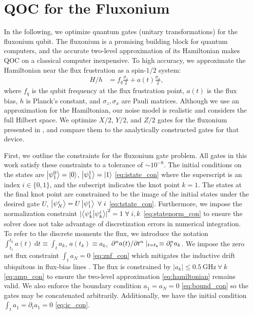 \section{QOC for the Fluxonium \label{sec:fluxonium}}
In the following, we optimize quantum gates
(unitary transformations) for the fluxonium qubit.
The fluxonium is a promising building block
for quantum computers, and the accurate
two-level approximation of its Hamiltonian makes
QOC on a classical computer inexpensive.
To high accuracy, we approximate the Hamiltonian near the flux frustration
as a spin-$1/2$ system:
\begin{align}
  H/h &= f_{q} \frac{\sigma_{z}}{2} + a(t) \frac{\sigma_{x}}{2},
  \label{eq:hamiltonian}
\end{align}
where $f_{q}$ is the qubit frequency at the flux frustration point,
$a(t)$ is the flux bias, $h$ is Planck's constant, and $\sigma_{z}, \sigma_{x}$
are Pauli matrices. Although we use an approximation for the Hamiltonian,
our noise model is realistic and considers the full Hilbert space. We optimize $X/2$,
$Y/2$, and $Z/2$ gates for the fluxonium presented in \cite{zhang2020universal},
and compare them to the analytically constructed gates for
that device.

First, we outline the constraints for the fluxonium gate problem.
All gates in this work satisfy these constraints to a tolerance
of $\sim 10^{-8}$.
The initial conditions on
the states are $\ket{\psi^{0}_{1}} = \ket{0}$, $\ket{\psi^{1}_{1}} = \ket{1}$
\eqref{eq:istate_con}
where the superscript is an index $i \in \{0, 1\}$,
and the subscript indicates the knot point $k = 1$.
The states at the final knot point are constrained to be
the image of the initial states under the desired gate $U$,
$\ket{\psi^{i}_{N}} = U \ket{\psi^{i}_{1}} \ \forall \ i$
\eqref{eq:tstate_con}.
Furthermore, we impose the normalization constraint
${\lvert \braket{\psi^{i}_{k}}{\psi^{i}_{k}} \rvert}^{2} = 1 \ \forall \ i,k$
\eqref{eq:statenorm_con}
to ensure the solver does not take advantage of discretization errors in numerical integration.
To refer to the discrete moments the flux, we introduce the notation
$\int^{t_{k}}_{t_{1}} a(t) \ \mathrm{d}t \equiv \int_{t} a_{k}$,
$a(t_{k}) \equiv a_{k}$,
$\pdv*[n]{a(t)}{t} \lvert_{t = t_{k}} \equiv \partial^{n}_{t} a_{k}$.
We impose the zero net flux constraint $\int_{t} a_{N} = 0$
\eqref{eq:znf_con}
which mitigates the inductive drift ubiquitous in flux-bias lines
\cite{battistel2019fast, krantz2019quantum, zhang2020universal}.
The flux is constrained by $\lvert a_{k} \rvert \leq 0.5 \ \textrm{GHz} \ \forall \ k$
\eqref{eq:amp_con}
to ensure the two-level approximation \eqref{eq:hamiltonian} remains valid.
We also enforce the boundary condition $a_{1} = a_{N} = 0$ \eqref{eq:bound_con}
so the gates may be concatenated arbitrarily. Additionally,
we have the initial condition $\int_{t} a_{1} = \partial_{t} a_{1} = 0$
\eqref{eq:ic_con}.

